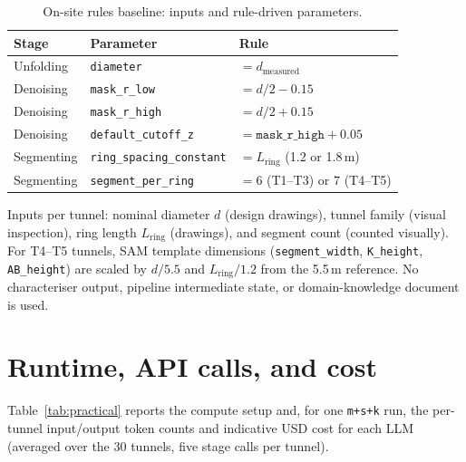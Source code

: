 \begin{table}[ht]
\caption{On-site rules baseline: inputs and rule-driven parameters.}\label{tab:rules-spec}
\begin{tabular*}{\tblwidth}{@{} l l l @{}}
\toprule
Stage & Parameter & Rule \\
\midrule
Unfolding & \texttt{diameter} & $= d_{\mathrm{measured}}$ \\
Denoising & \texttt{mask\_r\_low} & $= d/2 - 0.15$ \\
Denoising & \texttt{mask\_r\_high} & $= d/2 + 0.15$ \\
Denoising & \texttt{default\_cutoff\_z} & $= \texttt{mask\_r\_high} + 0.05$ \\
Segmenting & \texttt{ring\_spacing\_constant} & $= L_{\mathrm{ring}}$ (1.2 or 1.8\,m) \\
Segmenting & \texttt{segment\_per\_ring} & $= 6$ (T1--T3) or $7$ (T4--T5) \\
\bottomrule
\end{tabular*}
\end{table}

\noindent Inputs per tunnel: nominal diameter $d$ (design drawings), tunnel family (visual inspection), ring length $L_{\mathrm{ring}}$ (drawings), and segment count (counted visually). For T4--T5 tunnels, SAM template dimensions (\texttt{segment\_width}, \texttt{K\_height}, \texttt{AB\_height}) are scaled by $d/5.5$ and $L_\mathrm{ring}/1.2$ from the 5.5\,m reference. No characteriser output, pipeline intermediate state, or domain-knowledge document is used.

\section{Runtime, API calls, and cost}\label{app:practical}
Table~\ref{tab:practical} reports the compute setup and, for one \texttt{m+s+k} run, the per-tunnel input/output token counts and indicative USD cost for each LLM (averaged over the 30 tunnels, five stage calls per tunnel).

